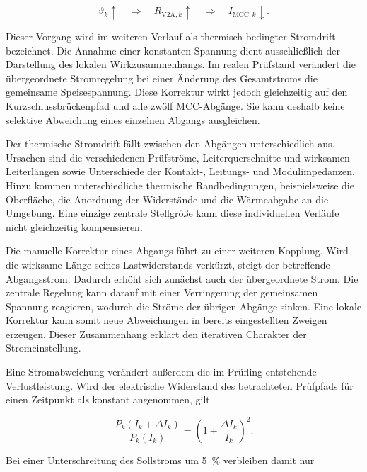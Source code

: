 \begin{equation}
    \vartheta_k \uparrow
    \quad\Longrightarrow\quad
    R_{\mathrm{V2A},k} \uparrow
    \quad\Longrightarrow\quad
    I_{\mathrm{MCC},k} \downarrow.
    \label{eq:ist_kausalkette_stromdrift}
\end{equation}

Dieser Vorgang wird im weiteren Verlauf als thermisch bedingter Stromdrift
bezeichnet. Die Annahme einer konstanten Spannung dient ausschließlich der
Darstellung des lokalen Wirkzusammenhangs. Im realen Prüfstand verändert die
übergeordnete Stromregelung bei einer Änderung des Gesamtstroms die
gemeinsame Speisespannung. Diese Korrektur wirkt jedoch gleichzeitig auf den
Kurzschlussbrückenpfad und alle zwölf MCC-Abgänge. Sie kann deshalb keine
selektive Abweichung eines einzelnen Abgangs ausgleichen.

Der thermische Stromdrift fällt zwischen den Abgängen unterschiedlich aus.
Ursachen sind die verschiedenen Prüfströme, Leiterquerschnitte und wirksamen
Leiterlängen sowie Unterschiede der Kontakt-, Leitungs- und
Modulimpedanzen. Hinzu kommen unterschiedliche thermische Randbedingungen,
beispielsweise die Oberfläche, die Anordnung der Widerstände und die
Wärmeabgabe an die Umgebung. Eine einzige zentrale Stellgröße kann diese
individuellen Verläufe nicht gleichzeitig kompensieren.

Die manuelle Korrektur eines Abgangs führt zu einer weiteren Kopplung. Wird
die wirksame Länge seines Lastwiderstands verkürzt, steigt der betreffende
Abgangsstrom. Dadurch erhöht sich zunächst auch der übergeordnete Strom. Die
zentrale Regelung kann darauf mit einer Verringerung der gemeinsamen Spannung
reagieren, wodurch die Ströme der übrigen Abgänge sinken. Eine lokale
Korrektur kann somit neue Abweichungen in bereits eingestellten Zweigen
erzeugen. Dieser Zusammenhang erklärt den iterativen Charakter der
Stromeinstellung.

Eine Stromabweichung verändert außerdem die im Prüfling entstehende
Verlustleistung. Wird der elektrische Widerstand des betrachteten
Prüfpfads für einen Zeitpunkt als konstant angenommen, gilt

\begin{equation}
    \frac{P_k(I_k+\Delta I_k)}{P_k(I_k)}
    =
    \left(1+\frac{\Delta I_k}{I_k}\right)^2.
    \label{eq:ist_leistungsabweichung_stromabweichung}
\end{equation}

Bei einer Unterschreitung des Sollstroms um \SI{5}{\percent} verbleiben
damit nur

